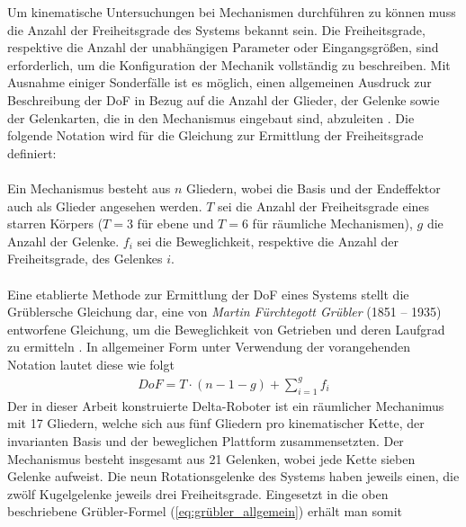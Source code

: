 \documentclass[Bachelor, BMR, ngerman]{twbook}
\begin{document}
    Um kinematische Untersuchungen bei Mechanismen durchführen zu können muss die Anzahl der Freiheitsgrade des Systems bekannt sein. Die Freiheitsgrade, respektive die Anzahl der unabhängigen Parameter oder Eingangsgrößen, sind erforderlich, um die Konfiguration der Mechanik vollständig zu beschreiben. Mit Ausnahme einiger Sonderfälle ist es möglich, einen allgemeinen Ausdruck zur Beschreibung der DoF in Bezug auf die Anzahl der Glieder, der Gelenke sowie der Gelenkarten, die in den Mechanismus eingebaut sind, abzuleiten \cite{Ts99}. Die folgende Notation wird für die Gleichung zur Ermittlung der Freiheitsgrade definiert:\\
    \\
    Ein Mechanismus besteht aus $n$ Gliedern, wobei die Basis und der Endeffektor auch als Glieder angesehen werden. $T$ sei die Anzahl der Freiheitsgrade eines starren Körpers ($T = 3$ für ebene und $T = 6$ für räumliche Mechanismen), $g$ die Anzahl der Gelenke. $f_i$ sei die Beweglichkeit, respektive die Anzahl der Freiheitsgrade, des Gelenkes $i$.\\
    \\
    Eine etablierte Methode zur Ermittlung der DoF eines Systems stellt die Grüblersche Gleichung dar, eine von \textit{Martin Fürchtegott Grübler} (1851 – 1935) entworfene Gleichung, um die Beweglichkeit von Getrieben und deren Laufgrad zu ermitteln \cite{Wo11}. In allgemeiner Form unter Verwendung der vorangehenden Notation lautet diese wie folgt
    \newline
    \begin{align}
        DoF = T \cdot (n-1-g) + \sum_{i=1}^g f_i
        \label{eq:grübler_allgemein}
    \end{align}
    \noindent
    Der in dieser Arbeit konstruierte Delta-Roboter ist ein räumlicher Mechanimus mit 17 Gliedern, welche sich aus fünf Gliedern pro kinematischer Kette, der invarianten Basis und der beweglichen Plattform zusammensetzten. Der Mechanismus besteht insgesamt aus 21 Gelenken, wobei jede Kette sieben Gelenke aufweist. Die neun Rotationsgelenke des Systems haben jeweils einen, die zwölf Kugelgelenke jeweils drei Freiheitsgrade. Eingesetzt in die oben beschriebene Grübler-Formel (\ref{eq:grübler_allgemein}) erhält man somit
\end{document}
